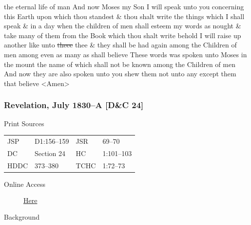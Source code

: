 the eternal life of man And now Moses my Son I will speak unto you concerning this Earth upon which thou standest \& thou shalt write the things which I shall speak \& in a day when the children of men shall esteem my words as nought \& take many of them from the Book which thou shalt write behold I will raise up another like unto \sout{theee} thee \& they shall be had again among the Children of men among even as many as shall believe These words was spoken unto Moses in the mount the name of which shall not be known among the Children of men And now they are also spoken unto you shew them not unto any except them that believe <Amen>
				
		\subsubsection{Revelation, July 1830--A [D\&C 24]}
			\label{EMS-1830-JS-JUL-1830-A}
		
			\begin{description}
				\item[Print Sources]
			\end{description}

				\begin{tabular}{p{0.5in}p{1in}p{0.5in}p{1in}}
				JSP	 	& D1:156--159	& JSR 		& 69--70		\\
				DC	 	& Section 24	& HC 		& 1:101--103 	\\
				HDDC 	& 373--380		& TCHC 		& 1:72--73 			\\
				\end{tabular}
			
			\begin{description}
				\item[Online Access] \href{https://www.josephsmithpapers.org/paper-summary/revelation-july-1830-a-dc-24/1}{Here}
			\end{description}
			
			\begin{description}
				\item[Background]
			\end{description}
			
			
